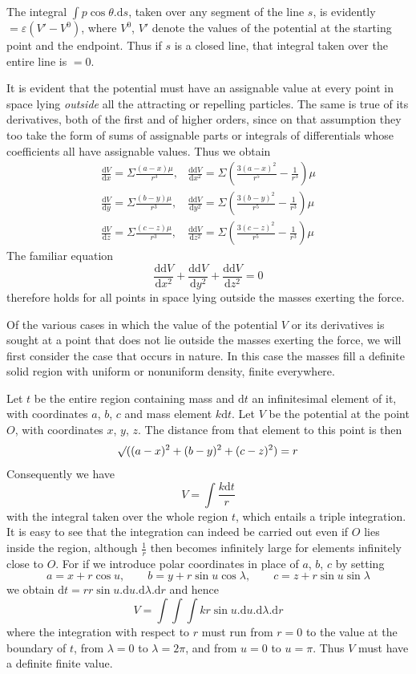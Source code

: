 The integral $\int p\cos\theta.\mathrm{d}s$, taken over any segment of the line $s$, is evidently $=\varepsilon(V'-V^0)$, where $V^0$, $V'$ denote the values of the potential at the starting point and the endpoint. Thus if $s$ is a closed line, that integral taken over the entire line is $=0$.

It is evident that the potential must have an assignable value at every point in space lying \textit{outside} all the attracting or repelling particles. The same is true of its derivatives, both of the first and of higher orders, since on that assumption they too take the form of sums of assignable parts or integrals of differentials whose coefficients all have assignable values. Thus we obtain
\[
\begin{array}{ll}
\displaystyle\frac{\mathrm{d}V}{\mathrm{d}x}=\Sigma\frac{(a-x)\mu}{r^3},&\displaystyle\frac{\mathrm{d}\mathrm{d}V}{\mathrm{d}x^2}=\Sigma(\frac{3(a-x)^2}{r^5}-\frac{1}{r^3})\mu\\[6pt]
\displaystyle\frac{\mathrm{d}V}{\mathrm{d}y}=\Sigma\frac{(b-y)\mu}{r^3},&\displaystyle\frac{\mathrm{d}\mathrm{d}V}{\mathrm{d}y^2}=\Sigma(\frac{3(b-y)^2}{r^5}-\frac{1}{r^3})\mu\\[6pt]
\displaystyle\frac{\mathrm{d}V}{\mathrm{d}z}=\Sigma\frac{(c-z)\mu}{r^3},&\displaystyle\frac{\mathrm{d}\mathrm{d}V}{\mathrm{d}z^2}=\Sigma(\frac{3(c-z)^2}{r^5}-\frac{1}{r^3})\mu
\end{array}
\]
The familiar equation
\[
\frac{\mathrm{d}\mathrm{d}V}{\mathrm{d}x^2}+\frac{\mathrm{d}\mathrm{d}V}{\mathrm{d}y^2}+\frac{\mathrm{d}\mathrm{d}V}{\mathrm{d}z^2}=0
\]
therefore holds for all points in space lying outside the masses exerting the force.

Of the various cases in which the value of the potential $V$ or its derivatives is sought at a point that does not lie outside the masses exerting the force, we will first consider the case that occurs in nature. In this case the masses fill a definite solid region with uniform or nonuniform density, finite everywhere.

Let $t$ be the entire region containing mass and $\mathrm{d}t$ an infinitesimal element of it, with coordinates $a$, $b$, $c$ and mass element $k\mathrm{d}t$. Let $V$ be the potential at the point $O$, with coordinates $x$, $y$, $z$. The distance from that element to this point is then
\[
\mathord{{}^{}\!\surd}((a-x)^2+(b-y)^2+(c-z)^2)=r
\]
Consequently we have
\[
V=\int\frac{k\mathrm{d}t}{r}
\]
with the integral taken over the whole region $t$, which entails a triple integration. It is easy to see that the integration can indeed be carried out even if $O$ lies inside the region, although $\frac{1}{r}$ then becomes infinitely large for elements infinitely close to $O$. For if we introduce polar coordinates in place of $a$, $b$, $c$ by setting
\[
a=x+r\cos u,\qquad b=y+r\sin u\cos\lambda,\qquad c=z+r\sin u\sin\lambda
\]
we obtain $\mathrm{d}t=rr\sin u.\mathrm{d}u.\mathrm{d}\lambda.\mathrm{d}r$ and hence
\[
V=\int\!\int\!\int kr\sin u.\mathrm{d}u.\mathrm{d}\lambda.\mathrm{d}r
\]
where the integration with respect to $r$ must run from $r=0$ to the value at the boundary of $t$, from $\lambda=0$ to $\lambda=2\pi$, and from $u=0$ to $u=\pi$. Thus $V$ must have a definite finite value.

